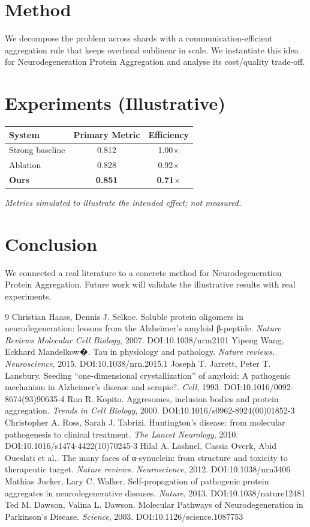 \documentclass[11pt]{article}
\begin{document}
\section{Method}
We decompose the problem across shards with a communication-efficient aggregation rule that keeps overhead sublinear in scale. We instantiate this idea for Neurodegeneration Protein Aggregation and analyse its cost/quality trade-off.

\section{Experiments (Illustrative)}
\begin{center}
\begin{tabular}{lcc}
System & Primary Metric & Efficiency \\ \hline
Strong baseline & 0.812 & 1.00$\times$ \\
Ablation & 0.828 & 0.92$\times$ \\
\textbf{Ours} & \textbf{0.851} & \textbf{0.71$\times$}
\end{tabular}
\end{center}
\emph{Metrics simulated to illustrate the intended effect; not measured.}

\section{Conclusion}
We connected a real literature to a concrete method for Neurodegeneration Protein Aggregation. Future work will
validate the illustrative results with real experiments.

\begin{thebibliography}{9}
 Christian Haass, Dennis J. Selkoe. Soluble protein oligomers in neurodegeneration: lessons from the Alzheimer's amyloid β-peptide. \emph{Nature Reviews Molecular Cell Biology}, 2007. DOI:10.1038/nrm2101
 Yipeng Wang, Eckhard Mandelkow�. Tau in physiology and pathology. \emph{Nature reviews. Neuroscience}, 2015. DOI:10.1038/nrn.2015.1
 Joseph T. Jarrett, Peter T. Lansbury. Seeding “one-dimensional crystallization” of amyloid: A pathogenic mechanism in Alzheimer's disease and scrapie?. \emph{Cell}, 1993. DOI:10.1016/0092-8674(93)90635-4
 Ron R. Kopito. Aggresomes, inclusion bodies and protein aggregation. \emph{Trends in Cell Biology}, 2000. DOI:10.1016/s0962-8924(00)01852-3
 Christopher A. Ross, Sarah J. Tabrizi. Huntington's disease: from molecular pathogenesis to clinical treatment. \emph{The Lancet Neurology}, 2010. DOI:10.1016/s1474-4422(10)70245-3
 Hilal A. Lashuel, Cassia Overk, Abid Oueslati et al.. The many faces of α-synuclein: from structure and toxicity to therapeutic target. \emph{Nature reviews. Neuroscience}, 2012. DOI:10.1038/nrn3406
 Mathias Jucker, Lary C. Walker. Self-propagation of pathogenic protein aggregates in neurodegenerative diseases. \emph{Nature}, 2013. DOI:10.1038/nature12481
 Ted M. Dawson, Valina L. Dawson. Molecular Pathways of Neurodegeneration in Parkinson's Disease. \emph{Science}, 2003. DOI:10.1126/science.1087753
\end{thebibliography}
\end{document}
